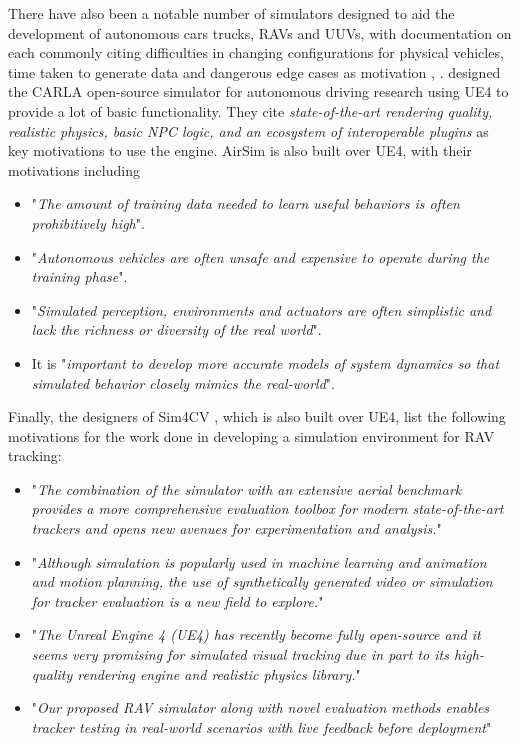 There have also been a notable number of simulators designed to aid the development of autonomous cars trucks, RAVs and UUVs, with documentation on each commonly citing difficulties in changing configurations for physical vehicles, time taken to generate data and dangerous edge cases as motivation \cite{Dosovitskiy2017CARLA:Simulator} \cite{Wymann2015TORCS:Simulator}, \cite{Shah2017AirSim:Vehicles} \cite{Bojarski2016EndCars}. \citeauthor{Dosovitskiy2017CARLA:Simulator} designed the CARLA open-source simulator \cite{Dosovitskiy2017CARLA:Simulator} for autonomous driving research using UE4 to provide a lot of basic functionality. They cite \textit{state-of-the-art rendering quality, realistic physics, basic NPC logic, and an ecosystem of interoperable plugins} as key motivations to use the engine. AirSim \cite{Shah2017AirSim:Vehicles} is also built over UE4, with their motivations including
\begin{itemize}
    \item "\textit{The amount of training data needed to learn useful behaviors is often prohibitively high}".
    \item "\textit{Autonomous vehicles are often unsafe and expensive to operate during the training phase}".
    \item "\textit{Simulated perception, environments and actuators are often simplistic and lack the richness or diversity of the real world}".
    \item It is "\textit{important to develop more accurate models of system dynamics so that simulated behavior closely mimics the real-world}".
\end{itemize}

Finally, the designers of Sim4CV \cite{Mueller2016ATracking}, which is also built over UE4, list the following motivations for the work done in developing a simulation environment for RAV tracking:
\begin{itemize}
    \item "\textit{The combination of the simulator with an extensive aerial benchmark provides a more comprehensive evaluation toolbox for modern state-of-the-art trackers and opens new avenues for experimentation and analysis.}"
    \item {} "\textit{Although simulation is popularly used in machine learning and animation and motion planning, the use of synthetically generated video or simulation for tracker evaluation is a new field to explore.}"
    \item "\textit{The Unreal Engine 4 (UE4) has recently become fully open-source and it seems very promising for simulated visual tracking due in part to its high-quality rendering engine and realistic physics library.}"
    \item "\textit{Our proposed RAV simulator along with novel evaluation methods enables tracker testing in real-world scenarios with live feedback before deployment}"
\end{itemize}

